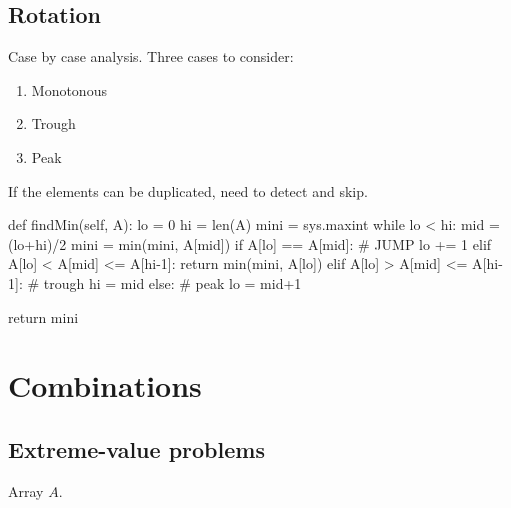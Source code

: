 \subsection{Rotation}
 Case by case analysis. Three cases to consider:
\begin{enumerate}
\item Monotonous 
\item Trough 
\item Peak
\end{enumerate}

If the elements can be duplicated, need to detect and skip. 
\begin{python}
def findMin(self, A):
    lo = 0
    hi = len(A)
    mini = sys.maxint
    while lo < hi:
        mid = (lo+hi)/2
        mini = min(mini, A[mid])
        if A[lo] == A[mid]:  # JUMP
            lo += 1
        elif A[lo] < A[mid] <= A[hi-1]:
            return min(mini, A[lo])
        elif A[lo] > A[mid] <= A[hi-1]:  # trough
            hi = mid
        else:  # peak
            lo = mid+1

    return mini
\end{python}
\section{Combinations}
\subsection{Extreme-value problems}\label{extremeValueProblem}
 Array $A$.

